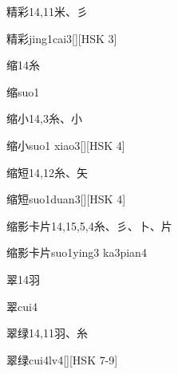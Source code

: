 \begin{Entry}{精彩}{14,11}{⽶、⼺}
  \begin{Phonetics}{精彩}{jing1cai3}[][HSK 3]
  \end{Phonetics}
\end{Entry}

\begin{Entry}{缩}{14}{⽷}
  \begin{Phonetics}{缩}{suo1}
  \end{Phonetics}
\end{Entry}

\begin{Entry}{缩小}{14,3}{⽷、⼩}
  \begin{Phonetics}{缩小}{suo1 xiao3}[][HSK 4]
  \end{Phonetics}
\end{Entry}

\begin{Entry}{缩短}{14,12}{⽷、⽮}
  \begin{Phonetics}{缩短}{suo1duan3}[][HSK 4]
  \end{Phonetics}
\end{Entry}

\begin{Entry}{缩影卡片}{14,15,5,4}{⽷、⼺、⼘、⽚}
  \begin{Phonetics}{缩影卡片}{suo1ying3 ka3pian4}
  \end{Phonetics}
\end{Entry}

\begin{Entry}{翠}{14}{⽻}
  \begin{Phonetics}{翠}{cui4}
  \end{Phonetics}
\end{Entry}

\begin{Entry}{翠绿}{14,11}{⽻、⽷}
  \begin{Phonetics}{翠绿}{cui4lv4}[][HSK 7-9]
  \end{Phonetics}
\end{Entry}

